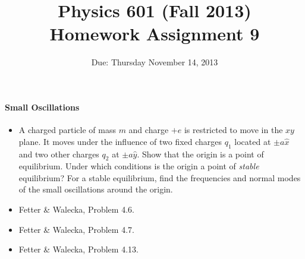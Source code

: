 \documentclass[letterpaper,11pt]{article}
\title{Physics 601 (Fall 2013) \\ Homework Assignment 9}
\date{Due: Thursday November 14, 2013}
\begin{document}
\maketitle

\paragraph*{Small Oscillations}
\begin{itemize}
 \item A charged particle of mass $m$ and charge $+e$ is restricted to move in the $xy$ plane.  It moves under the influence of two fixed charges $q_1$ located at $\pm a \hat{x}$ and two other charges $q_2$ at $\pm a \hat{y}$.  Show that the origin is a point of equilibrium.  Under which conditions is the origin a point of \emph{stable} equilibrium?  For a stable equilibrium, find the frequencies and normal modes of the small oscillations around the origin.
 \item Fetter \& Walecka, Problem 4.6.
 \item Fetter \& Walecka, Problem 4.7.
 \item Fetter \& Walecka, Problem 4.13.
\end{itemize}
\end{document}
